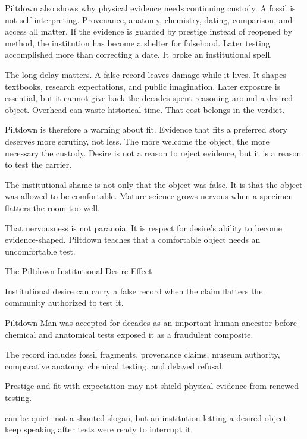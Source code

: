 Piltdown also shows why physical evidence needs continuing custody. A fossil
is not self-interpreting. Provenance, anatomy, chemistry, dating, comparison,
and access all matter. If the evidence is guarded by prestige instead of
reopened by method, the institution has become a shelter for falsehood. Later
testing accomplished more than correcting a date. It broke an institutional spell.

The long delay matters. A false record leaves damage while it lives. It
shapes textbooks, research expectations, and public imagination. Later
exposure is essential, but it cannot give back the decades spent reasoning
around a desired object. Overhead can waste historical time. That cost
belongs in the verdict.

Piltdown is therefore a warning about fit. Evidence that fits a preferred
story deserves more scrutiny, not less. The more welcome the object, the
more necessary the custody. Desire is not a reason to reject evidence, but it
is a reason to test the carrier.

The institutional shame is not only that the object was false. It is that the
object was allowed to be comfortable. Mature science grows nervous when a
specimen flatters the room too well.

That nervousness is not paranoia. It is respect for desire's ability to become
evidence-shaped. Piltdown teaches that a comfortable object needs an
uncomfortable test.

\begin{phenom}{The Piltdown Institutional-Desire Effect~\cite{weiner1955}}
\label{ph:piltdown-institutional-desire}

\PhStatement
Institutional desire can carry a false record when the claim flatters the
community authorized to test it.

\PhOrigin
Piltdown Man was accepted for decades as an important human ancestor before
chemical and anatomical tests exposed it as a fraudulent composite.

\PhObservation
The record includes fossil fragments, provenance claims, museum authority,
comparative anatomy, chemical testing, and delayed refusal.

\PhConstraint
Prestige and fit with expectation may not shield physical evidence from
renewed testing.

\PhConsequence
{} can be quiet: not a shouted slogan, but an institution
letting a desired object keep speaking after tests were ready to interrupt it.
\end{phenom}

